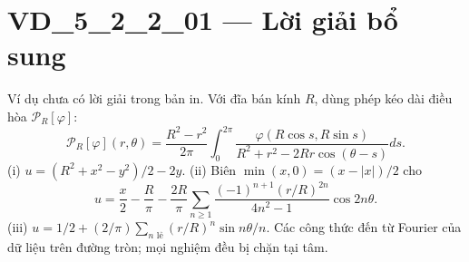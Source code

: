 \documentclass[10pt,a4paper]{article}
\begin{document}
\section*{VD\_5\_2\_2\_01 — Lời giải bổ sung}
Ví dụ chưa có lời giải trong bản in. Với đĩa bán kính $R$, dùng phép kéo dài điều hòa $\mathcal P_R[\varphi]$:
\[\mathcal P_R[\varphi](r,\theta)=\frac{R^2-r^2}{2\pi}\int_0^{2\pi}\frac{\varphi(R\cos s,R\sin s)}{R^2+r^2-2Rr\cos(\theta-s)}ds.\]
(i) $u=(R^2+x^2-y^2)/2-2y$.
(ii) Biên $\min(x,0)=(x-|x|)/2$ cho
\[u=\frac x2-\frac R\pi-\frac{2R}\pi\sum_{n\ge1}\frac{(-1)^{n+1}(r/R)^{2n}}{4n^2-1}\cos2n\theta.\]
(iii) $u=1/2+(2/\pi)\sum_{n\text{ lẻ}}(r/R)^n\sin n\theta/n$. Các công thức đến từ Fourier của dữ liệu trên đường tròn; mọi nghiệm đều bị chặn tại tâm.
\end{document}

